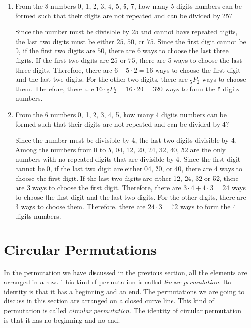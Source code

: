 \documentclass{report}
\newcommand\permtwo[2][^n]{{}_{#1}P_{#2}}
\begin{document}
\begin{multicols}{2}
\begin{enumerate}
    \item From the 8 numbers 0, 1, 2, 3, 4, 5, 6, 7, how many 5 digits numbers can be
          formed such that their digits are not repeated and can be divided by 25? \sol{}

          Since the number must be divisible by 25 and cannot have repeated digits, the
          last two digits must be either $25$, $50$, or $75$. Since the first digit
          cannot be 0, if the first two digits are $50$, there are 6 ways to choose the
          last three digits. If the first two digits are $25$ or $75$, there are 5 ways
          to choose the last three digits. Therefore, there are $6 + 5 \cdot 2 = 16$ ways
          to choose the first digit and the last two digits. For the other two digits,
          there are $\permtwo[5]{2}$ ways to choose them. Therefore, there are $16 \cdot
            \permtwo[5]{2} = 16 \cdot 20 = 320$ ways to form the 5 digits numbers.

    \item From the 6 numbers 0, 1, 2, 3, 4, 5, how many 4 digits numbers can be formed
          such that their digits are not repeated and can be divided by 4? \sol{}

          Since the number must be divisible by 4, the last two digits divisible by 4.
          Among the numbers from 0 to 5, 04, 12, 20, 24, 32, 40, 52 are the only numbers
          with no repeated digits that are divisible by 4. Since the first digit cannot
          be 0, if the last two digit are either 04, 20, or 40, there are 4 ways to
          choose the first digit. If the last two digits are either 12, 24, 32 or 52,
          there are 3 ways to choose the first digit. Therefore, there are $3 \cdot 4 + 4
            \cdot 3 = 24$ ways to choose the first digit and the last two digits. For the
          other digits, there are $3$ ways to choose them. Therefore, there are $24 \cdot
            3 = 72$ ways to form the 4 digits numbers.
  \end{enumerate}

  \section{Circular Permutations}

  In the permutation we have discussed in the previous section, all the elements
  are arranged in a row. This kind of permutation is called \textit{linear
    permutation}. Its identity is that it has a beginning and an end. The
  permutations we are going to discuss in this section are arranged on a closed
  curve line. This kind of permutation is called \textit{circular permutation}.
  The identity of circular permutation is that it has no beginning and no end.


\end{multicols}
\end{document}

